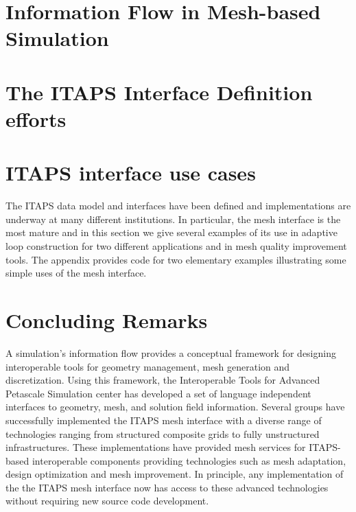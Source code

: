 \documentclass[global]{svjour}
\begin{document}
\section{Information Flow in Mesh-based Simulation}\label{sec:infoFlow}


\section{The ITAPS Interface Definition efforts}\label{sec:tsttdef}


\section{ITAPS interface use cases}\label{sec:apps}

The ITAPS data model and interfaces have been defined and
implementations are underway at many different institutions.
In particular, the mesh interface is the most mature and in this
section we give several examples of its use in adaptive loop
construction for two different applications and in mesh quality improvement
tools.  The appendix provides code for two elementary examples illustrating 
some simple uses of the mesh interface.




\section{Concluding Remarks}
A simulation's information flow provides a conceptual framework for
designing interoperable tools for geometry management, mesh generation
and discretization.  Using this framework, the Interoperable Tools for
Advanced Petascale Simulation center has developed a set of language
independent interfaces to geometry, mesh, and solution field
information.  Several groups have successfully implemented the ITAPS
mesh interface with a diverse range of technologies ranging from
structured composite grids to fully unstructured infrastructures.
These implementations have provided mesh services for ITAPS-based
interoperable components providing technologies such as mesh
adaptation, design optimization and mesh improvement.  In principle,
any implementation of the the ITAPS mesh interface now has access to
these advanced technologies without requiring new source code
development.
\end{document}
